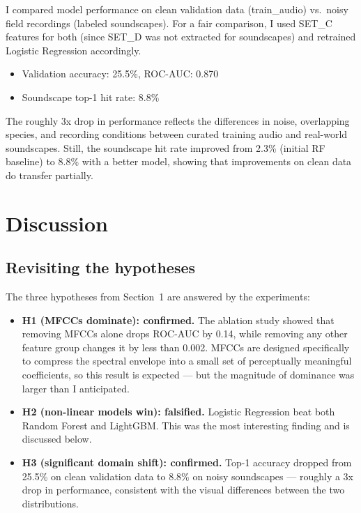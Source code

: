 \documentclass[11pt,a4paper]{article}
\begin{document}
I compared model performance on clean validation data (train\_audio) vs.\ noisy field recordings (labeled soundscapes). For a fair comparison, I used SET\_C features for both (since SET\_D was not extracted for soundscapes) and retrained Logistic Regression accordingly.

\begin{itemize}
    \item Validation accuracy: 25.5\%, ROC-AUC: 0.870
    \item Soundscape top-1 hit rate: 8.8\%
\end{itemize}

The roughly 3x drop in performance reflects the differences in noise, overlapping species, and recording conditions between curated training audio and real-world soundscapes. Still, the soundscape hit rate improved from 2.3\% (initial RF baseline) to 8.8\% with a better model, showing that improvements on clean data do transfer partially.

\section{Discussion}
\label{sec:discussion}

\subsection{Revisiting the hypotheses}

The three hypotheses from Section~1 are answered by the experiments:

\begin{itemize}
    \item \textbf{H1 (MFCCs dominate): confirmed.} The ablation study showed that removing MFCCs alone drops ROC-AUC by 0.14, while removing any other feature group changes it by less than 0.002. MFCCs are designed specifically to compress the spectral envelope into a small set of perceptually meaningful coefficients, so this result is expected — but the magnitude of dominance was larger than I anticipated.
    \item \textbf{H2 (non-linear models win): falsified.} Logistic Regression beat both Random Forest and LightGBM. This was the most interesting finding and is discussed below.
    \item \textbf{H3 (significant domain shift): confirmed.} Top-1 accuracy dropped from 25.5\% on clean validation data to 8.8\% on noisy soundscapes — roughly a 3x drop in performance, consistent with the visual differences between the two distributions.
\end{itemize}
\end{document}
